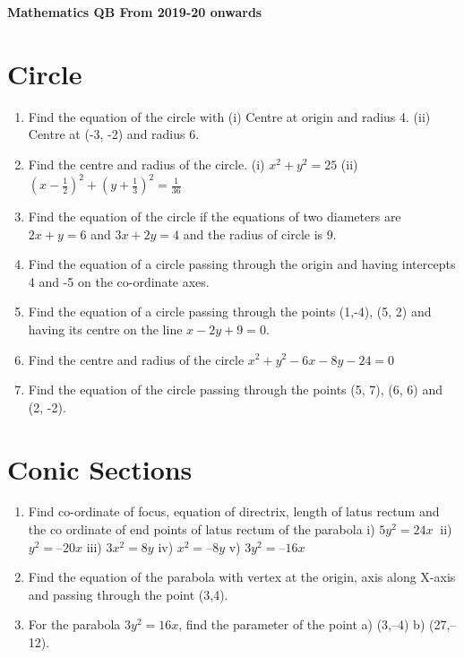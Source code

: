 \documentclass[17pt]{extarticle}
\begin{document}
\centering 
{\huge \bf Mathematics QB From 2019-20 onwards\par}
\vspace{1cm}
\begin{multicols}{2}
\section{Circle}
\noindent
\begin{enumerate}
 \item Find the equation of the circle with
(i) Centre at origin and radius 4.
(ii) Centre at (-3, -2) and radius 6.
\item Find the centre and radius of the circle.
(i) $x^2 + y^2 = 25$ (ii) $\left(x -\frac{1}{2}\right)^2 + \left(y +\frac{1}{3}\right)^2 = \frac{1}{36}$
\item Find the equation of the circle if the equations of two diameters are $2x + y = 6$ and $3x + 2y = 4$ and the radius of circle is 9.
\item Find the equation of a circle passing through the origin and having intercepts 4 and -5 on
the co-ordinate axes.

\item Find the equation of a circle passing through the points (1,-4), (5, 2) and having its centre on the line $x-2y+9 =0$.

\item Find the centre and radius of the circle $x^2 + y^2 - 6x - 8y - 24 = 0$ 

\item Find the equation of the circle passing through the points (5, 7), (6, 6) and (2, -2).

\end{enumerate} 


\section{Conic Sections}
\noindent
\begin{enumerate}
 \item  Find co-ordinate of focus, equation of directrix, length of latus rectum and the co ordinate of end points of latus rectum of the parabola i) $5y^2=24x\ $ ii) $y^2 = –20x$ iii) $3x^2 = 8y$ iv) $x^2 = –8y$ v) $3y ^2 = –16x$
\item Find the equation of the parabola with vertex at the origin, axis along X-axis and passing through the point (3,4).
\item For the parabola $3y^2 =16x$, find the parameter of the point a) (3,–4) b) (27,–12).


\end{enumerate}
\end{multicols}
\end{document}
